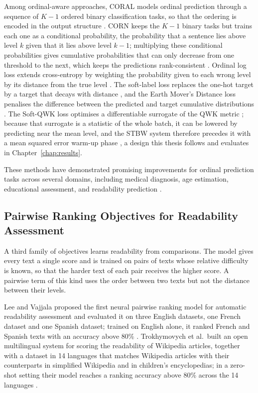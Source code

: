\documentclass[12pt]{report}
\begin{document}
Among ordinal-aware approaches, CORAL models ordinal prediction through a sequence of $K{-}1$ ordered binary classification tasks, so that the ordering is encoded in the output structure \cite{cao2020coral}. CORN keeps the $K{-}1$ binary tasks but trains each one as a conditional probability, the probability that a sentence lies above level $k$ given that it lies above level $k-1$; multiplying these conditional probabilities gives cumulative probabilities that can only decrease from one threshold to the next, which keeps the predictions rank-consistent \cite{shi2023deep}. Ordinal log loss extends cross-entropy by weighting the probability given to each wrong level by its distance from the true level \cite{castagnos2022ordinal}. The soft-label loss replaces the one-hot target by a target that decays with distance \cite{bertinetto2020soft}, and the Earth Mover's Distance loss penalises the difference between the predicted and target cumulative distributions \cite{hou2017emd}. The Soft-QWK loss optimises a differentiable surrogate of the QWK metric \cite{delatorre2018wkl,diaz2019softlabels}; because that surrogate is a statistic of the whole batch, it can be lowered by predicting near the mean level, and the STBW system therefore precedes it with a mean squared error warm-up phase \cite{trigui2025stbw}, a design this thesis follows and evaluates in Chapter~\ref{chap:results}.

These methods have demonstrated promising improvements for ordinal prediction tasks across several domains, including medical diagnosis, age estimation, educational assessment, and readability prediction \cite{castagnos2022ordinal}.

\subsection{Pairwise Ranking Objectives for Readability Assessment}
\label{subsec:pairwise_ranking}

A third family of objectives learns readability from comparisons. The model gives every text a single score and is trained on pairs of texts whose relative difficulty is known, so that the harder text of each pair receives the higher score. A pairwise term of this kind uses the order between two texts but not the distance between their levels.

Lee and Vajjala proposed the first neural pairwise ranking model for automatic readability assessment and evaluated it on three English datasets, one French dataset and one Spanish dataset; trained on English alone, it ranked French and Spanish texts with an accuracy above 80\% \cite{lee2022neural}. Trokhymovych et al.\ built an open multilingual system for scoring the readability of Wikipedia articles, together with a dataset in 14 languages that matches Wikipedia articles with their counterparts in simplified Wikipedia and in children's encyclopedias; in a zero-shot setting their model reaches a ranking accuracy above 80\% across the 14 languages \cite{trokhymovych2024open}.
\end{document}
